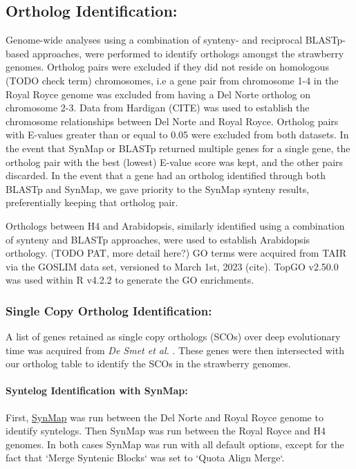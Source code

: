 \documentclass[fleqn,10pt]{olplainarticle}
\begin{document}
\subsection{Ortholog Identification:} \label{sec:methods_orthologs}
Genome-wide analyses using a combination of synteny- and reciprocal BLASTp- based approaches, were performed to identify orthologs amongst the strawberry genomes.
Ortholog pairs were excluded if they did not reside on homologous (TODO check term) chromosomes, i.e a gene pair from chromosome 1-4 in the Royal Royce genome was excluded from having a Del Norte ortholog on chromosome 2-3.
Data from Hardigan (CITE) was used to establish the chromosome relationships between Del Norte and Royal Royce.
Ortholog pairs with E-values greater than or equal to 0.05 were excluded from both datasets.
In the event that SynMap or BLASTp returned multiple genes for a single gene, the ortholog pair with the best (lowest) E-value score was kept, and the other pairs discarded.
In the event that a gene had an ortholog identified through both BLASTp and SynMap, we gave priority to the SynMap synteny results, preferentially keeping that ortholog pair. 

Orthologs between H4 and Arabidopsis, similarly identified using a combination of synteny and BLASTp approaches, were used to establish Arabidopsis orthology.
(TODO PAT, more detail here?)
GO terms were acquired from TAIR via the GOSLIM data set, versioned to March 1st, 2023 (cite).
TopGO v2.50.0 was used within R v4.2.2 to generate the GO enrichments.

\subsubsection{Single Copy Ortholog Identification:} \label{sec:methods_single_copy}
A list of genes retained as single copy orthologs (SCOs) over deep evolutionary time was acquired from \textit{De Smet et al.} \cite{DeSmet2013}.
These genes were then intersected with our ortholog table to identify the SCOs in the strawberry genomes.


\paragraph{Syntelog Identification with SynMap:} \label{sec:methods_syntelogs}
First, \href{https://genomevolution.org/CoGe/SynMap.pl}{SynMap} was run between the Del Norte and Royal Royce genome to identify syntelogs.
Then SynMap was run between the Royal Royce and H4 genomes.
In both cases SynMap was run with all default options, except for the fact that `Merge Syntenic Blocks` was set to `Quota Align Merge`.
\end{document}

